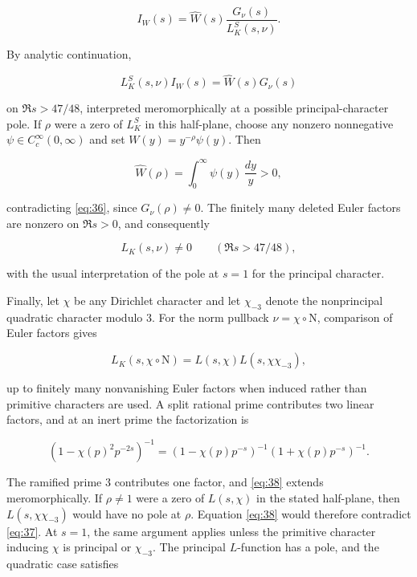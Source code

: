 \documentclass[reqno,a4paper,11pt]{amsart}
\begin{document}
\[
{I}_{W}\left( s\right) =\widehat{W}\left( s\right) \frac{{G}_{\nu }\left( s\right) }{{L}_{K}^{S}\left( s,\nu \right) }.
\]

By analytic continuation,

\begin{equation}\label{eq:36}
{L}_{K}^{S}\left( s,\nu \right) {I}_{W}\left( s\right) =\widehat{W}\left( s\right) {G}_{\nu }\left( s\right) 
\end{equation}

on $\Re s>47/48$, interpreted meromorphically at a possible principal-character pole. If $\rho $ were a zero of ${L}_{K}^{S}$ in this half-plane, choose any nonzero nonnegative $\psi \in {C}_{c}^{\infty }\left( 0,\infty \right) $ and set $W\left( y\right) ={y}^{-\rho }\psi \left( y\right) $. Then

\[
\widehat{W}\left( \rho \right) =\int _{0}^{\infty } \psi \left( y\right) \,\frac{dy}{y}>0,
\]

contradicting \eqref{eq:36}, since ${G}_{\nu }\left( \rho \right) \ne 0$. The finitely many deleted Euler factors are nonzero on $\Re s>0$, and consequently

\begin{equation}\label{eq:37}
{L}_{K}\left( s,\nu \right) \ne 0\quad \quad \left( \Re s>47/48\right) ,
\end{equation}

with the usual interpretation of the pole at $s=1$ for the principal character.

Finally, let $\chi $ be any Dirichlet character and let ${\chi }_{-3}$ denote the nonprincipal quadratic character modulo $3$. For the norm pullback $\nu =\chi \circ \mathrm{N}$, comparison of Euler factors gives

\begin{equation}\label{eq:38}
{L}_{K}\left( s,\chi \circ \mathrm{N}\right) =L\left( s,\chi \right) L\left( s,\chi {\chi }_{-3}\right) ,
\end{equation}

up to finitely many nonvanishing Euler factors when induced rather than primitive characters are used. A split rational prime contributes two linear factors, and at an inert prime the factorization is

\[
{\left( 1-\chi {\left( p\right) }^{2}{p}^{-2s}\right) }^{-1}={\left( 1-\chi \left( p\right) {p}^{-s}\right) }^{-1}{\left( 1+\chi \left( p\right) {p}^{-s}\right) }^{-1}.
\]

The ramified prime $3$ contributes one factor, and \eqref{eq:38} extends meromorphically. If $\rho \ne 1$ were a zero of $L(s,\chi )$ in the stated half-plane, then $L(s,\chi {\chi }_{-3})$ would have no pole at $\rho $. Equation \eqref{eq:38} would therefore contradict \eqref{eq:37}. At $s=1$, the same argument applies unless the primitive character inducing $\chi $ is principal or ${\chi }_{-3}$. The principal $L$-function has a pole, and the quadratic case satisfies
\end{document}
